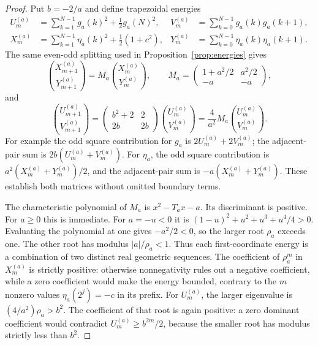 \documentclass[11pt,a4paper]{article}
\numberwithin{equation}{section}
\theoremstyle{definition}
\theoremstyle{remark}
\begin{document}
\begin{proof}
Put $b=-2/a$ and define trapezoidal energies
\begin{align*}
 U_m^{(a)}&=\sum_{k=1}^{N-1}g_a(k)^2+\tfrac12g_a(N)^2,&
 V_m^{(a)}&=\sum_{k=0}^{N-1}g_a(k)g_a(k+1),\\
 X_m^{(a)}&=\sum_{k=1}^{N-1}\eta_a(k)^2+\tfrac12(1+c^2),&
 Y_m^{(a)}&=\sum_{k=0}^{N-1}\eta_a(k)\eta_a(k+1).
\end{align*}
The same even-odd splitting used in Proposition~\ref{prop:energies} gives
\begin{equation}
 \binom{X_{m+1}^{(a)}}{Y_{m+1}^{(a)}}=
 M_a\binom{X_m^{(a)}}{Y_m^{(a)}},\qquad
 M_a=\begin{pmatrix}1+a^2/2&a^2/2\\-a&-a\end{pmatrix},
 \label{eq:param-energy}
\end{equation}
and
\begin{equation}
 \binom{U_{m+1}^{(a)}}{V_{m+1}^{(a)}}=
 \begin{pmatrix}b^2+2&2\\2b&2b\end{pmatrix}
 \binom{U_m^{(a)}}{V_m^{(a)}}
 =\frac4{a^2}M_a\binom{U_m^{(a)}}{V_m^{(a)}}.
 \label{eq:param-genergy}
\end{equation}
For example the odd square contribution for $g_a$ is $2U_m^{(a)}+2V_m^{(a)}$;
the adjacent-pair sum is $2b(U_m^{(a)}+V_m^{(a)})$. For $\eta_a$, the odd square
contribution is $a^2(X_m^{(a)}+Y_m^{(a)})/2$, and the adjacent-pair sum is
$-a(X_m^{(a)}+Y_m^{(a)})$. These establish both matrices without omitted
boundary terms.

The characteristic polynomial of $M_a$ is $x^2-T_ax-a$. Its discriminant is
positive. For $a\ge0$ this is immediate. For $a=-u<0$ it is
$(1-u)^2+u^2+u^3+u^4/4>0$. Evaluating the polynomial at one gives $-a^2/2<0$,
so the larger root $\rho_a$ exceeds one. The other root has modulus
$|a|/\rho_a<1$. Thus each first-coordinate energy is a combination of two
distinct real geometric sequences. The coefficient of $\rho_a^m$ in
$X_m^{(a)}$ is strictly positive: otherwise nonnegativity rules out a negative
coefficient, while a zero coefficient would make the energy bounded, contrary
to the $m$ nonzero values $\eta_a(2^j)=-c$ in its prefix.
For $U_m^{(a)}$, the larger eigenvalue is $(4/a^2)\rho_a>b^2$. The coefficient
of that root is again positive: a zero dominant coefficient would contradict
$U_m^{(a)}\ge b^{2m}/2$, because the smaller root has modulus strictly less than
$b^2$.


\end{proof}
\end{document}
